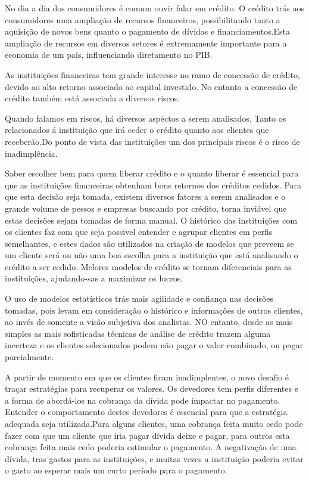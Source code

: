 
    No dia a dia dos consumidores é comum ouvir falar em crédito. O crédito trás aos consumidores uma ampliação de recursos financeiros, possibilitando tanto a aquisição de novos bens quanto o pagamento de dívidas e financiamentos.Esta ampliação de recursos em diversos setores é extremamente importante para a economia de um país, influenciando diretamento no PIB.
    
    As instituições financeiras tem grande interesse no ramo de concessão de crédito, devido ao alto retorno associado ao capital investido. No entanto a concessão de crédito também  está associada a diversos riscos. 
    
    Quando falamos em riscos, há diversos aspéctos a serem analisados. Tanto os relacionados á instituição que irá ceder o crédito quanto aos clientes que receberão.Do ponto de vista das instituições um dos principais riscos é o risco de inadimplência.
    
    Saber escolher bem para quem liberar crédito e o quanto liberar é essencial para que as instituições financeiras obtenham bons retornos dos créditos cedidos. Para que esta decisão seja tomada, existem diversos fatores a serem analisados e o grande volume de pessos e empresas buscando por crédito, torna inviável que estas decisões sejam tomadas de forma manual. O histórico das instituições com os clientes faz com que seja possivel entender e agrupar clientes em perfis semelhantes, e estes dados são utilizados na criação de modelos que preveem se um cliente será ou não uma boa escolha para a instituição que está analisando o crédito a ser cedido. Melores modelos de crédito se tornam diferenciais para as instituições, ajudando-sas a maximizar os lucros.
    
    O uso de modelos estatísticos trás mais agilidade e confiança nas decisões tomadas, pois levam em consideração o histórico e informações de outros clientes, ao invés de somente a visão subjetiva dos analistas. NO entanto, desde as mais simples as mais sofisticadas técnicas de análise de crédito trazem alguma incerteza e os clientes selecionados podem não pagar o valor combinado, ou pagar parcialmente.
    
    A partir de momento em que os clientes ficam inadimplentes, o novo desafio é traçar estratégias para recuperar os valores. Os devedores tem perfis diferentes e a forma de abordá-los na cobrança da dívida pode impactar no pagamento. Entender o comportamento destes devedores é essencial para que a estratégia adequada seja utilizada.Para alguns clientes, uma cobrança feita muito cedo pode fazer com que um cliente que iria pagar dívida deixe e pagar, para outros esta cobrança feita mais cedo poderia estimular o pagamento. A negativação de uma dívida, tras gastos para as instituições, e muitas vezes a instituição poderia evitar o gasto ao esperar mais um curto período para o pagamento.
    

